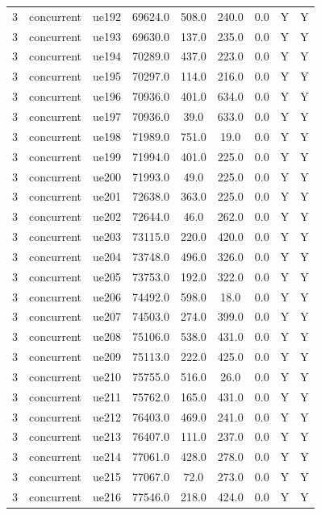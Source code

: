 \begin{table}[ht]
\begin{tabular}{|c|c|c|c|c|c|c|c|c|}
3 & concurrent & ue192 & 69624.0 & 508.0 & 240.0 & 0.0 & Y & Y \\
3 & concurrent & ue193 & 69630.0 & 137.0 & 235.0 & 0.0 & Y & Y \\
3 & concurrent & ue194 & 70289.0 & 437.0 & 223.0 & 0.0 & Y & Y \\
3 & concurrent & ue195 & 70297.0 & 114.0 & 216.0 & 0.0 & Y & Y \\
3 & concurrent & ue196 & 70936.0 & 401.0 & 634.0 & 0.0 & Y & Y \\
3 & concurrent & ue197 & 70936.0 & 39.0 & 633.0 & 0.0 & Y & Y \\
3 & concurrent & ue198 & 71989.0 & 751.0 & 19.0 & 0.0 & Y & Y \\
3 & concurrent & ue199 & 71994.0 & 401.0 & 225.0 & 0.0 & Y & Y \\
3 & concurrent & ue200 & 71993.0 & 49.0 & 225.0 & 0.0 & Y & Y \\
3 & concurrent & ue201 & 72638.0 & 363.0 & 225.0 & 0.0 & Y & Y \\
3 & concurrent & ue202 & 72644.0 & 46.0 & 262.0 & 0.0 & Y & Y \\
3 & concurrent & ue203 & 73115.0 & 220.0 & 420.0 & 0.0 & Y & Y \\
3 & concurrent & ue204 & 73748.0 & 496.0 & 326.0 & 0.0 & Y & Y \\
3 & concurrent & ue205 & 73753.0 & 192.0 & 322.0 & 0.0 & Y & Y \\
3 & concurrent & ue206 & 74492.0 & 598.0 & 18.0 & 0.0 & Y & Y \\
3 & concurrent & ue207 & 74503.0 & 274.0 & 399.0 & 0.0 & Y & Y \\
3 & concurrent & ue208 & 75106.0 & 538.0 & 431.0 & 0.0 & Y & Y \\
3 & concurrent & ue209 & 75113.0 & 222.0 & 425.0 & 0.0 & Y & Y \\
3 & concurrent & ue210 & 75755.0 & 516.0 & 26.0 & 0.0 & Y & Y \\
3 & concurrent & ue211 & 75762.0 & 165.0 & 431.0 & 0.0 & Y & Y \\
3 & concurrent & ue212 & 76403.0 & 469.0 & 241.0 & 0.0 & Y & Y \\
3 & concurrent & ue213 & 76407.0 & 111.0 & 237.0 & 0.0 & Y & Y \\
3 & concurrent & ue214 & 77061.0 & 428.0 & 278.0 & 0.0 & Y & Y \\
3 & concurrent & ue215 & 77067.0 & 72.0 & 273.0 & 0.0 & Y & Y \\
3 & concurrent & ue216 & 77546.0 & 218.0 & 424.0 & 0.0 & Y & Y \\

\end{tabular}
\end{table}

